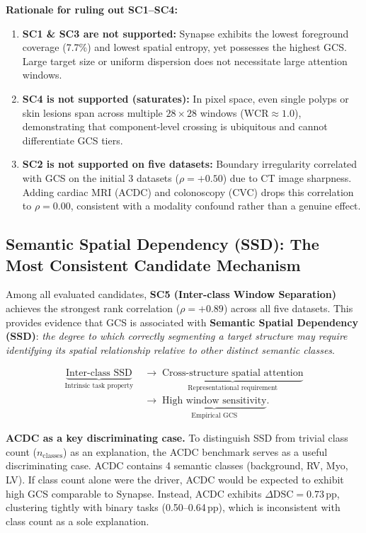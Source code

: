 \textbf{Rationale for ruling out SC1--SC4:}
\begin{enumerate}
  \item \textbf{SC1 \& SC3 are not supported:} Synapse exhibits the lowest foreground coverage (7.7\%) and lowest spatial entropy, yet possesses the highest GCS. Large target size or uniform dispersion does not necessitate large attention windows.
  \item \textbf{SC4 is not supported (saturates):} In pixel space, even single polyps or skin lesions span across multiple $28{\times}28$ windows ($\text{WCR} \approx 1.0$), demonstrating that component-level crossing is ubiquitous and cannot differentiate GCS tiers.
  \item \textbf{SC2 is not supported on five datasets:} Boundary irregularity correlated with GCS on the initial 3 datasets ($\rho{=}+0.50$) due to CT image sharpness. Adding cardiac MRI (ACDC) and colonoscopy (CVC) drops this correlation to $\rho{=}0.00$, consistent with a modality confound rather than a genuine effect.
\end{enumerate}

\subsection{Semantic Spatial Dependency (SSD): The Most Consistent Candidate Mechanism}
\label{sec:ssd}

Among all evaluated candidates, \textbf{SC5 (Inter-class Window Separation)} achieves the strongest rank correlation ($\rho = +0.89$) across all five datasets. This provides evidence that GCS is associated with \textbf{Semantic Spatial Dependency (SSD)}: \emph{the degree to which correctly segmenting a target structure may require identifying its spatial relationship relative to other distinct semantic classes}.

\begin{align*}
  \underbrace{\text{Inter-class SSD}}_{\text{Intrinsic task property}}
  &\;\longrightarrow\;
  \underbrace{\text{Cross-structure spatial attention}}_{\text{Representational requirement}} \\
  &\;\longrightarrow\;
  \underbrace{\text{High window sensitivity}}_{\text{Empirical GCS}}.
\end{align*}

\textbf{ACDC as a key discriminating case.} To distinguish SSD from trivial class count ($n_\text{classes}$) as an explanation, the ACDC benchmark serves as a useful discriminating case. ACDC contains 4 semantic classes (background, RV, Myo, LV). If class count alone were the driver, ACDC would be expected to exhibit high GCS comparable to Synapse. Instead, ACDC exhibits $\Delta\text{DSC} = 0.73$\,pp, clustering tightly with binary tasks (0.50--0.64\,pp), which is inconsistent with class count as a sole explanation.

